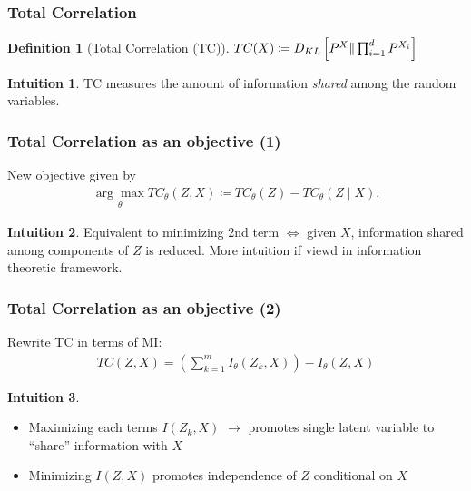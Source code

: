 \documentclass{beamer}
\theoremstyle{definition}
\newtheorem{definition}[section]{Definition}
\newtheorem{intuition}{Intuition}
\begin{document}
    \begin{frame}
      \frametitle{Total Correlation}
      \begin{definition}[Total Correlation (TC)]
        $TC(X) \coloneqq D_{KL}\left[P^{X} \large  \Vert \prod_{i=1}^{d}P^{{X_{i}}}\right] $
      \end{definition}
      \begin{intuition}
        TC measures the amount of information \textit{shared} among the random variables.
      \end{intuition}
    \end{frame}

    \begin{frame}
      \frametitle{Total Correlation as an objective (1)}
      New objective given by
      \begin{align*}
        \underset{\theta}{\arg \max}TC_{\theta}(Z, X) \coloneqq TC_{\theta}(Z) - TC_{\theta}(Z \mid X).
      \end{align*}
      \begin{intuition}
        Equivalent to minimizing 2nd term $\iff$ given $X$, information shared among components of $Z$ is reduced.
        \newline
        More intuition if viewd in information theoretic framework.
      \end{intuition}
    \end{frame}

    \begin{frame}
      \frametitle{Total Correlation as an objective (2)}
      Rewrite TC in terms of MI:
      \begin{align*}
        TC(Z, X) = \left(\sum_{k=1}^{m}I_{\theta}(Z_{k}, X)\right) - I_{\theta}(Z, X)
      \end{align*}

      \begin{intuition}
        \begin{itemize}
          \item Maximizing each terms $I(Z_{k}, X)$ $\to$ promotes single latent variable to \enquote{share} information with $X$
          \item Minimizing $I(Z, X)$ promotes independence of $Z$ conditional on $X$

        \end{itemize}
      \end{intuition}
    \end{frame}
\end{document}

